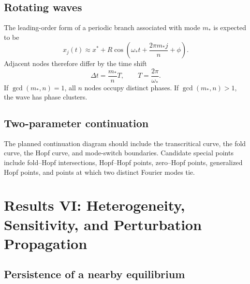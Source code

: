 \documentclass[11pt, reqno]{amsart}
\theoremstyle{definition}
\theoremstyle{remark}
\begin{document}
\subsection{Rotating waves}

The leading-order form of a periodic branch associated with mode $m_*$ is
expected to be
\begin{equation}
\label{eq:rotating-wave}
    x_j(t)
    \approx
    x^*
    +R\cos\left(
        \omega_*t+\frac{2\pi m_*j}{n}+\phi
    \right).
\end{equation}
Adjacent nodes therefore differ by the time shift
\begin{equation}
\label{eq:phase-shift}
    \Delta t
    =
    \frac{m_*}{n}T,
    \qquad
    T=\frac{2\pi}{\omega_*}.
\end{equation}
If $\gcd(m_*,n)=1$, all $n$ nodes occupy distinct phases.  If
$\gcd(m_*,n)>1$, the wave has phase clusters.


\subsection{Two-parameter continuation}

The planned continuation diagram should include the transcritical curve, the
fold curve, the Hopf curve, and mode-switch boundaries.  Candidate special
points include fold--Hopf intersections, Hopf--Hopf points, zero--Hopf points,
generalized Hopf points, and points at which two distinct Fourier modes tie.


\section{Results VI: Heterogeneity, Sensitivity, and Perturbation Propagation}
\label{sec:heterogeneity}

\subsection{Persistence of a nearby equilibrium}
\end{document}
